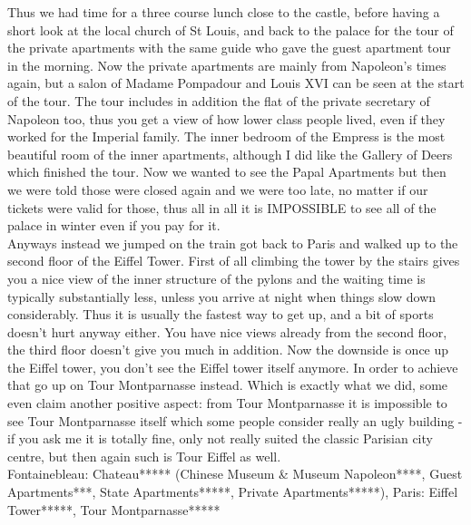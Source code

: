 Thus we had time for a three course lunch close to the castle, before having a short look at the local church of St Louis, and back to the palace for the tour of the private apartments with the same guide who gave the guest apartment tour in the morning. Now the private apartments are mainly from Napoleon's times again, but a salon of Madame Pompadour and Louis XVI can be seen at the start of the tour. The tour includes in addition the flat of the private secretary of Napoleon too, thus you get a view of how lower class people lived, even if they worked for the Imperial family. The inner bedroom of the Empress is the most beautiful room of the inner apartments, although I did like the Gallery of Deers which finished the tour. Now we wanted to see the Papal Apartments but then we were told those were closed again and we were too late, no matter if our tickets were valid for those, thus all in all it is IMPOSSIBLE to see all of the palace in winter even if you pay for it.\\
Anyways instead we jumped on the train got back to Paris and walked up to the second floor of the Eiffel Tower. First of all climbing the tower by the stairs gives you a nice view of the inner structure of the pylons and the waiting time is typically substantially less, unless you arrive at night when things slow down considerably. Thus it is usually the fastest way to get up, and a bit of sports doesn't hurt anyway either. You have nice views already from the second floor, the third floor doesn't give you much in addition. Now the downside is once up the Eiffel tower, you don't see the Eiffel tower itself anymore. In order to achieve that go up on Tour Montparnasse instead. Which is exactly what we did, some even claim another positive aspect: from Tour Montparnasse it is impossible to see Tour Montparnasse itself which some people consider really an ugly building - if you ask me it is totally fine, only not really suited the classic Parisian city centre, but then again such is Tour Eiffel as well. \\

Fontainebleau: Chateau***** (Chinese Museum \& Museum Napoleon****, Guest Apartments***, State Apartments*****, Private Apartments*****), Paris: Eiffel Tower*****, Tour Montparnasse*****\\

